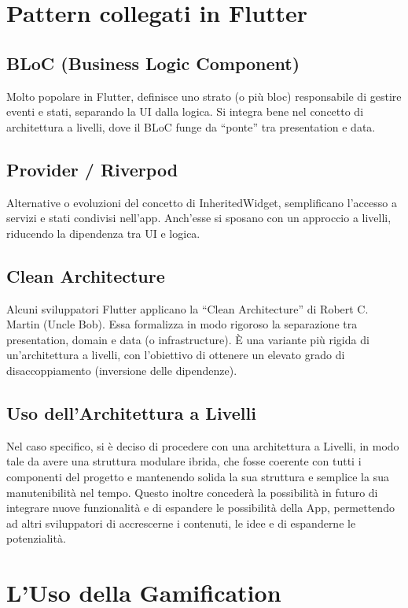 \documentclass[14pt]{extbook}
\begin{document}
\section{Pattern collegati in Flutter}
\subsection{BLoC (Business Logic Component)}
Molto popolare in Flutter, definisce uno strato (o più bloc) responsabile di gestire eventi e stati, separando la UI dalla logica. Si integra bene nel concetto di architettura a livelli, dove il BLoC funge da “ponte” tra presentation e data.\cite{angelov2018bloc}

\subsection{Provider / Riverpod}
Alternative o evoluzioni del concetto di InheritedWidget, semplificano l’accesso a servizi e stati condivisi nell’app. Anch’esse si sposano con un approccio a livelli, riducendo la dipendenza tra UI e logica.\cite{martin2012clean}

\subsection{Clean Architecture}
Alcuni sviluppatori Flutter applicano la “Clean Architecture” di Robert C. Martin (Uncle Bob). Essa formalizza in modo rigoroso la separazione tra presentation, domain e data (o infrastructure). È una variante più rigida di un’architettura a livelli, con l’obiettivo di ottenere un elevato grado di disaccoppiamento (inversione delle dipendenze).\cite{rousselet2019provider}

\subsection{Uso dell'Architettura a Livelli}
Nel caso specifico, si è deciso di procedere con una architettura a Livelli, in modo tale da avere una struttura modulare ibrida, che fosse coerente con tutti i componenti del progetto e mantenendo solida la sua struttura e semplice la sua manutenibilità nel tempo. Questo inoltre concederà la possibilità in futuro di integrare nuove funzionalità e di espandere le possibilità della App, permettendo ad altri sviluppatori di accrescerne i contenuti, le idee e di espanderne le potenzialità.

\section{L'Uso della Gamification}
\end{document}
